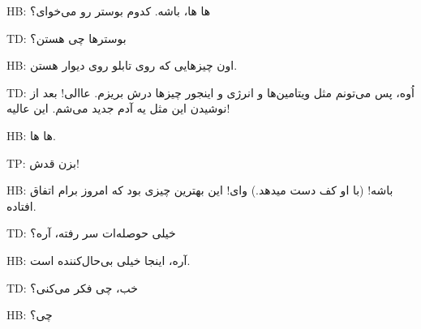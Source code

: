 \LTR 
HB: ها ها، باشه. کدوم بوستر رو می‌خوای؟  

\LTR 
TD: بوسترها چی هستن؟  

\LTR 
HB: اون چیزهایی که روی تابلو روی دیوار هستن.  

\LTR 
TD: اُوه، پس می‌تونم مثل ویتامین‌ها و انرژی و اینجور چیزها درش بریزم. عاالی! بعد از نوشیدن این مثل یه آدم جدید می‌شم. این عالیه!  

\LTR 
HB: ها ها.  

\LTR 
TP: بزن قدش!  

\LTR 
HB: باشه! (با او کف دست میدهد.) وای! این بهترین چیزی بود که امروز برام اتفاق افتاده.  

\LTR 
TD: خیلی حوصله‌ات سر رفته، آره؟  

\LTR 
HB: آره، اینجا خیلی بی‌حال‌کننده است.  

\LTR 
TD: خب، چی فکر می‌کنی؟  

\LTR 
HB: چی؟